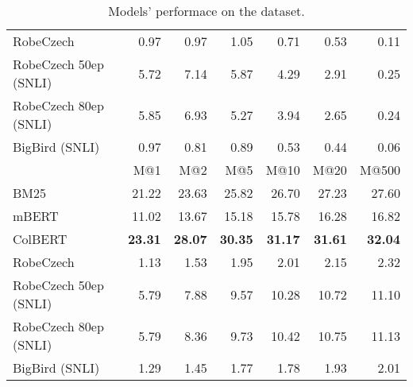 \begin{table}[!htb]
\begin{tabular}{lrrrrrr}
            RobeCzech &   0.97 &   0.97 &   1.05 &   0.71 &   0.53 &    0.11 \\
RobeCzech 50ep (SNLI) &   5.72 &   7.14 &   5.87 &   4.29 &   2.91 &    0.25 \\
RobeCzech 80ep (SNLI) &   5.85 &   6.93 &   5.27 &   3.94 &   2.65 &    0.24 \\
       BigBird (SNLI) &   0.97 &   0.81 &   0.89 &   0.53 &   0.44 &    0.06 \\
        \midrule
           {}    &  M@1 &  M@2 &  M@5 &  M@10 &  M@20 &  M@500 \\
        \midrule
                          BM25 &  21.22 &  23.63 &  25.82 &   26.70 &   27.23 &    27.60 \\
                         mBERT &  11.02 &  13.67 &  15.18 &   15.78 &   16.28 &    16.82 \\
                       ColBERT &  \bf{23.31} &  \bf{28.07} &  \bf{30.35} &   \bf{31.17} &   \bf{31.61} &    \bf{32.04} \\
                     RobeCzech &   1.13 &   1.53 &   1.95 &    2.01 &    2.15 &     2.32 \\
         RobeCzech 50ep (SNLI) &   5.79 &   7.88 &   9.57 &   10.28 &   10.72 &    11.10 \\
         RobeCzech 80ep (SNLI) &   5.79 &   8.36 &   9.73 &   10.42 &   10.75 &    11.13 \\
                BigBird (SNLI) &   1.29 &   1.45 &   1.77 &    1.78 &    1.93 &     2.01 \\
        \bottomrule
        \end{tabular}
    \caption[\CTK{} Metrics]{Models' performace on the \CTK{} dataset.}
    \label{tab:ctk_results}
\end{table}
